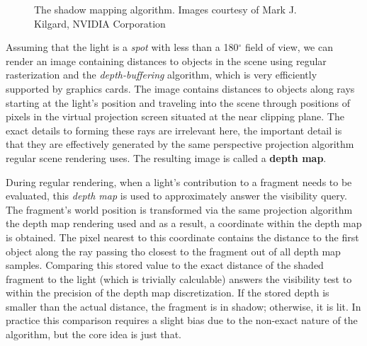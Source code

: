 \begin{figure}[h!]
  \centering
  \caption{The shadow mapping algorithm. Images courtesy of Mark J. Kilgard, NVIDIA Corporation}
  \label{fig:ShadowMappingAlgorithm}
\end{figure}

Assuming that the light is a \emph{spot} with less than a 180$^\circ$ field of view, we can render an image containing distances to objects in the scene using regular rasterization and the \emph{depth-buffering} algorithm, which is very efficiently supported by graphics cards. The image contains distances to objects along rays starting at the light's position and traveling into the scene through positions of pixels in the virtual projection screen situated at the near clipping plane. The exact details to forming these rays are irrelevant here, the important detail is that they are effectively generated by the same perspective projection algorithm regular scene rendering uses. The resulting image is called a \textbf{depth map}.

During regular rendering, when a light's contribution to a fragment needs to be evaluated, this \emph{depth map} is used to approximately answer the visibility query. The fragment's world position is transformed via the same projection algorithm the depth map rendering used and as a result, a coordinate within the depth map is obtained. The pixel nearest to this coordinate contains the distance to the first object along the ray passing tho closest to the fragment out of all depth map samples. Comparing this stored value to the exact distance of the shaded fragment to the light (which is trivially calculable) answers the visibility test to within the precision of the depth map discretization. If the stored depth is smaller than the actual distance, the fragment is in shadow; otherwise, it is lit. In practice this comparison requires a slight bias due to the non-exact nature of the algorithm, but the core idea is just that.

